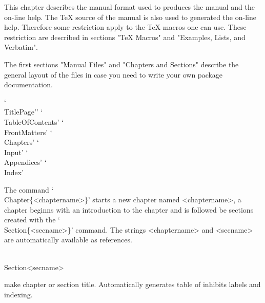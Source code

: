 
This chapter  describes  the manual  format used  to produces the  {\GAP}
manual and the on-line help.   The {\TeX}  source of  the manual is  also
used to generated the on-line help.   Therefore some restriction apply to
the {\TeX}  macros  one can   use.   These restriction are  described  in
sections "TeX Macros" and "Examples, Lists, and Verbatim".

The first sections "Manual  Files"  and "Chapters and Sections"  describe
the  general  layout of the  files  in case  you need to   write your own
package documentation.


`\\TitlePage''
`\\TableOfContents'
`\\FrontMatters'
`\\Chapters'
  `\\Input'
`\\Appendices'
  `\\Index'



The  command `\\Chapter\{<chaptername>\}'  starts  a   new chapter  named
<chaptername>, a chapter beginns with an  introduction to the chapter and
is followed  be   sections  created  with  the   `\\Section\{<secname>\}'
command.   The strings  <chaptername>  and   <secname> are  automatically
available as references.


\\Section{<secname>}\null

      make chapter or section title. Automatically generates table of
      inhibits labels and indexing.

